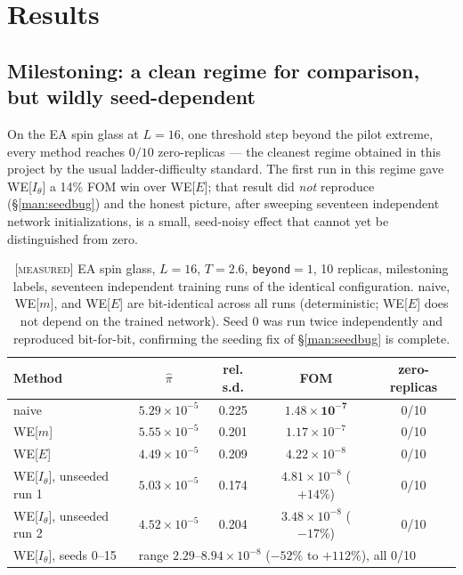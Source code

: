 \documentclass[11pt,a4paper]{article}
\newcommand{\MEAS}{\textcolor{blue!60!black}{\footnotesize[\textsc{measured}]}}
\begin{document}
\section{Results}\label{sec:results}

\subsection{Milestoning: a clean regime for comparison, but wildly seed-dependent}\label{sec:milestoneresults}
On the EA spin glass at $L=16$, one threshold step beyond the pilot extreme, every method reaches
$0/10$ zero-replicas --- the cleanest regime obtained in this project by the usual
ladder-difficulty standard. The first run in this regime gave WE[$I_\theta$] a 14\% FOM win over
WE[$E$]; that result did \emph{not} reproduce (\S\ref{man:seedbug}) and the honest picture, after
sweeping seventeen independent network initializations, is a small, seed-noisy effect that cannot
yet be distinguished from zero.

\begin{table}[H]\centering\small
\caption{\MEAS{} EA spin glass, $L=16$, $T=2.6$, \texttt{beyond}$=1$, 10 replicas, milestoning
labels, seventeen independent training runs of the identical configuration. naive, WE[$m$], and
WE[$E$] are bit-identical across all runs (deterministic; WE[$E$] does not depend on the trained
network). Seed 0 was run twice independently and reproduced bit-for-bit, confirming the seeding
fix of \S\ref{man:seedbug} is complete.}
\begin{tabular}{lcccc}\toprule
Method & $\hat\pi$ & rel. s.d. & FOM & zero-replicas\\\midrule
naive & $5.29\times10^{-5}$ & 0.225 & $\mathbf{1.48\times10^{-7}}$ & 0/10\\
WE[$m$] & $5.55\times10^{-5}$ & 0.201 & $1.17\times10^{-7}$ & 0/10\\
WE[$E$] & $4.49\times10^{-5}$ & 0.209 & $4.22\times10^{-8}$ & 0/10\\
WE[$I_\theta$], unseeded run 1 & $5.03\times10^{-5}$ & 0.174 & $4.81\times10^{-8}$ ($+14\%$) & 0/10\\
WE[$I_\theta$], unseeded run 2 & $4.52\times10^{-5}$ & 0.204 & $3.48\times10^{-8}$ ($-17\%$) & 0/10\\
WE[$I_\theta$], seeds 0--15 & \multicolumn{4}{l}{range $2.29$--$8.94\times10^{-8}$ ($-52\%$ to $+112\%$), all 0/10}\\
\bottomrule\end{tabular}
\end{table}
\end{document}
